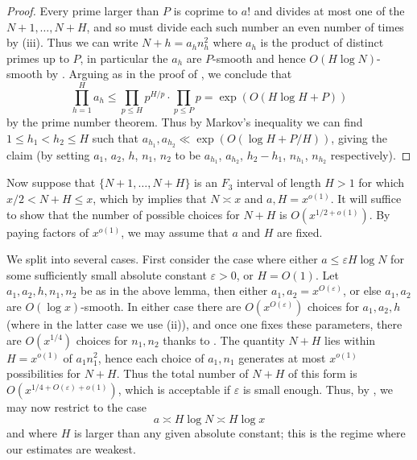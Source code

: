 \documentclass[12pt]{amsart}
\newcommand{\eps}{\varepsilon}
\begin{document}
\begin{proof}  Every prime larger than $P$ is coprime to $a!$ and divides at most one of the $N+1,\dots,N+H$, and so must divide each such number an even number of times by (iii).  Thus we can write $N+h = a_h n_h^2$ where $a_h$ is the product of distinct primes up to $P$, in particular the $a_h$ are $P$-smooth and hence $O(H \log N)$-smooth by . Arguing as in the proof of , we conclude that
$$ \prod_{h=1}^H a_h \leq \prod_{p \leq H} p^{H/p} \cdot \prod_{p \leq P} p = \exp(O( H \log H + P ))$$
by the prime number theorem. Thus by Markov's inequality we can find $1 \leq h_1 < h_2 \leq H$ such that $a_{h_1}, a_{h_2} \ll \exp(O(\log H + P/H))$, giving the claim (by setting $a_1$, $a_2$, $h$, $n_1$, $n_2$ to be $a_{h_1}$, $a_{h_2}$, $h_2-h_1$, $n_{h_1}$, $n_{h_2}$ respectively).
\end{proof}

Now suppose that $\{N+1,\dots,N+H\}$ is an $F_3$ interval of length $H > 1$ for which $x/2 < N+H \leq x$, which by  implies that $N \asymp x$ and $a, H = x^{o(1)}$.  It will suffice to show that the number of possible choices for $N+H$ is $O(x^{1/2+o(1)})$.  By paying factors of $x^{o(1)}$, we may assume that $a$ and $H$ are fixed.

We split into several cases.  First consider the case where either $a \leq \eps H \log N$ for some sufficiently small absolute constant $\eps > 0$, or $H = O(1)$.  Let $a_1, a_2, h, n_1, n_2$ be as in the above lemma, then either $a_1,a_2 = x^{O(\eps)}$, or else $a_1,a_2$ are $O(\log x)$-smooth.  In either case there are $O(x^{O(\eps)})$ choices for $a_1,a_2, h$ (where in the latter case we use (ii)), and once one fixes these parameters, there are $O(x^{1/4})$ choices for $n_1, n_2$ thanks to .  The quantity $N+H$ lies within $H = x^{o(1)}$ of $a_1 n_1^2$, hence each choice of $a_1, n_1$ generates at most $x^{o(1)}$ possibilities for $N+H$.  Thus the total number of $N+H$ of this form is $O( x^{1/4 + O(\eps) + o(1)} )$, which is acceptable if $\eps$ is small enough.  Thus, by , we may now restrict to the case
\begin{equation}\label{ahn}
    a \asymp H \log N \asymp H \log x
\end{equation}
and where $H$ is larger than any given absolute constant; this is the regime where our estimates are weakest.
\end{document}
